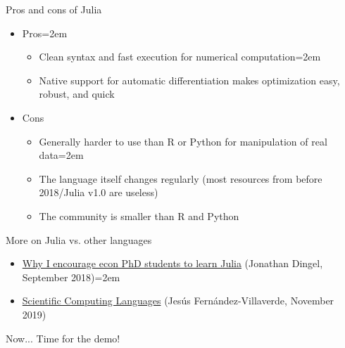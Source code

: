 \documentclass[handout]{beamer}
\begin{document}
\begin{frame}{Pros and cons of Julia}
\begin{itemize}
    \item Pros\itemsep=2em
    \begin{itemize}
        \item Clean syntax and fast execution for numerical computation\itemsep=2em
        \item Native support for automatic differentiation makes optimization easy, robust, and quick
    \end{itemize}
    \item<2-> Cons
    \begin{itemize}
        \item Generally harder to use than R or Python for manipulation of real data\itemsep=2em
        \item The language itself changes regularly (most resources from before 2018/Julia v1.0 are useless)
        \item The community is smaller than R and Python
    \end{itemize}
\end{itemize}
\end{frame}

\begin{frame}{More on Julia vs. other languages}
\begin{itemize}
    \item \href{https://tradediversion.net/2018/09/17/why-i-encourage-econ-phd-students-to-learn-julia/}{Why I encourage econ PhD students to learn Julia} (Jonathan Dingel, September 2018)\itemsep=2em
    \item \href{https://www.sas.upenn.edu/~jesusfv/Lecture_HPC_5_Scientific_Computing_Languages.pdf}{Scientific Computing Languages} (Jesús Fernández-Villaverde, November 2019)
\end{itemize}
\end{frame}

\begin{frame}{Now...}
Time for the demo!
\end{frame}
\end{document}
